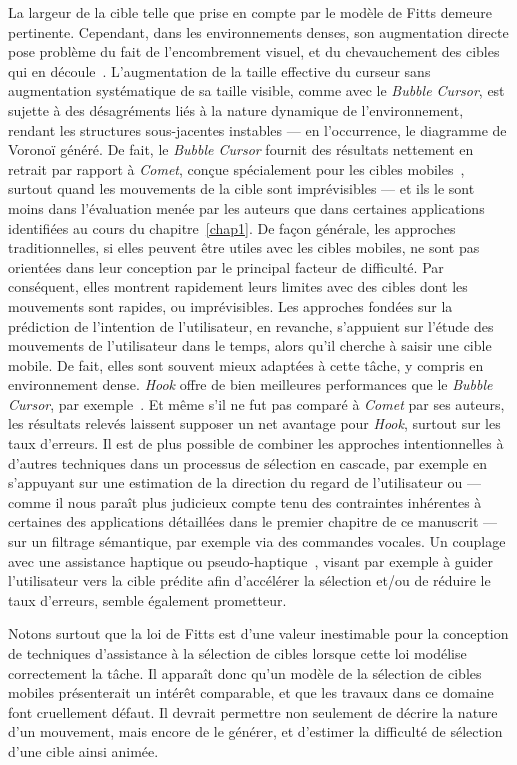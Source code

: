     La largeur de la cible telle que prise en compte par le modèle de Fitts demeure pertinente. Cependant, dans les environnements denses, son augmentation directe pose problème du fait de l'encombrement visuel, et du chevauchement des cibles qui en découle~\cite{mcguffin2002acquisition}. L'augmentation de la taille effective du curseur sans augmentation systématique de sa taille visible, comme avec le \emph{Bubble Cursor}, est sujette à des désagréments liés à la nature dynamique de l'environnement, rendant les structures sous-jacentes instables --- en l'occurrence, le diagramme de Voronoï généré. De fait, le \emph{Bubble Cursor} fournit des résultats nettement en retrait par rapport à \emph{Comet}, conçue spécialement pour les cibles mobiles~\cite{hasan2011comet}, surtout quand les mouvements de la cible sont imprévisibles --- et ils le sont moins dans l'évaluation menée par les auteurs que dans certaines applications identifiées au cours du chapitre~\ref{chap1}. De façon générale, les approches traditionnelles, si elles peuvent être utiles avec les cibles mobiles, ne sont pas orientées dans leur conception par le principal facteur de difficulté. Par conséquent, elles montrent rapidement leurs limites avec des cibles dont les mouvements sont rapides, ou imprévisibles. Les approches fondées sur la prédiction de l'intention de l'utilisateur, en revanche, s'appuient sur l'étude des mouvements de l'utilisateur dans le temps, alors qu'il cherche à saisir une cible mobile. De fait, elles sont souvent mieux adaptées à cette tâche, y compris en environnement dense. \emph{Hook} offre de bien meilleures performances que le \emph{Bubble Cursor}, par exemple~\cite{ortega2013hook}. Et même s'il ne fut pas comparé à \emph{Comet} par ses auteurs, les résultats relevés laissent supposer un net avantage pour \emph{Hook}, surtout sur les taux d'erreurs. Il est de plus possible de combiner les approches intentionnelles à d'autres techniques dans un processus de sélection en cascade, par exemple en s'appuyant sur une estimation de la direction du regard de l'utilisateur ou --- comme il nous paraît plus judicieux compte tenu des contraintes inhérentes à certaines des applications détaillées dans le premier chapitre de ce manuscrit --- sur un filtrage sémantique, par exemple via des commandes vocales. Un couplage avec une assistance haptique ou pseudo-haptique~\cite{lecuyer2009simulating, pusch2011pseudo}, visant par exemple à guider l'utilisateur vers la cible prédite afin d'accélérer la sélection et/ou de réduire le taux d'erreurs, semble également prometteur.
    
    Notons surtout que la loi de Fitts est d'une valeur inestimable pour la conception de techniques d'assistance à la sélection de cibles lorsque cette loi modélise correctement la tâche. Il apparaît donc qu'un modèle de la sélection de cibles mobiles présenterait un intérêt comparable, et que les travaux dans ce domaine font cruellement défaut. Il devrait permettre non seulement de décrire la nature d'un mouvement, mais encore de le générer, et d'estimer la difficulté de sélection d'une cible ainsi animée.